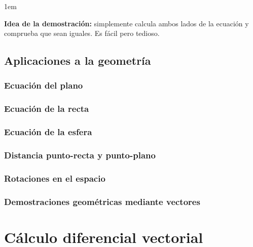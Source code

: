 \documentclass[12pt, fleqn]{report}                             %
\newenvironment{SmallIndentation}[1][0.75em]                    %
    {\begin{adjustwidth}{#1}{}\begin{footnotesize}}                 %
    {\end{footnotesize}\end{adjustwidth}}                           %
\begin{document}
            	\begin{SmallIndentation}[1em]
            		\textbf{Idea de la demostración:} simplemente calcula ambos lados de la ecuación y comprueba que sean iguales. Es fácil pero tedioso.
            	\end{SmallIndentation}
            
            
            
            
            
            
            
    \chapter{Aplicaciones a la geometría}
        
        \section{Ecuación del plano}
            
        \section{Ecuación de la recta}
        
        \section{Ecuación de la esfera}
            
        \section{Distancia punto-recta y punto-plano}
        
        \section{Rotaciones en el espacio}
        
        \section{Demostraciones geométricas mediante vectores}
            


\part{Cálculo diferencial vectorial}
\end{document}
